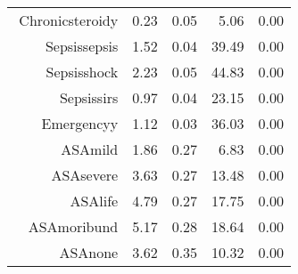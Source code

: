 \begin{tabular}{rrrrr}
$$  Chronic\-steroid\-y & 0.23 & 0.05 & 5.06 & 0.00 \\ 
  Sepsis\-sepsis & 1.52 & 0.04 & 39.49 & 0.00 \\ 
  Sepsis\-shock & 2.23 & 0.05 & 44.83 & 0.00 \\ 
  Sepsis\-sirs & 0.97 & 0.04 & 23.15 & 0.00 \\ 
  Emergency\-y & 1.12 & 0.03 & 36.03 & 0.00 \\ 
  ASA\-mild & 1.86 & 0.27 & 6.83 & 0.00 \\ 
  ASA\-severe & 3.63 & 0.27 & 13.48 & 0.00 \\ 
  ASA\-life & 4.79 & 0.27 & 17.75 & 0.00 \\ 
  ASA\-moribund & 5.17 & 0.28 & 18.64 & 0.00 \\ 
  ASA\-none & 3.62 & 0.35 & 10.32 & 0.00 \\ 
   \hline
\end{tabular}

